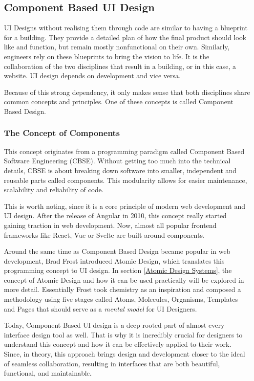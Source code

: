 \newpage
\subsection{Component Based UI Design}
UI Designs without realising them through code are similar to having a blueprint for a building.
They provide a detailed plan of how the final product should look like and function, but remain
mostly nonfunctional on their own. Similarly, engineers rely on these blueprints to bring the vision
to life. It is the collaboration of the two disciplines that result in a building, or in this case,
a website. UI design depends on development and vice versa. 

Because of this strong dependency, it only makes sense that both disciplines share common concepts
and principles. One of these concepts is called Component Based Design.

\subsubsection{The Concept of Components}
This concept originates from a programming paradigm called Component Based Software Engineering
(CBSE). Without getting too much into the technical details, CBSE is about breaking down software
into smaller, independent and reusable parts called components. This modularity allows for easier
maintenance, scalability and reliability of code.

This is worth noting, since it is a core principle of modern web development and UI design.
After the release of Angular in 2010, this concept really started gaining traction in web
development. 
Now, almost all popular frontend frameworks like React, Vue or Svelte are built around components.
  

Around the same time as Component Based Design became popular in web development, Brad Frost
introduced Atomic Design, which translates this programming concept to UI design. In section
\ref{Atomic Design Systems}, the concept of Atomic Design and how it can be used practically will be
explored in more detail. Essentially Frost took chemistry as an inspiration and composed a methodology
using five stages called Atoms, Molecules, Organisms, Templates and Pages that should serve as a
\textit{mental model} for UI Designers. 

Today, Component Based UI design is a deep rooted part of almost every interface design tool as
well. That is why it is incredibly crucial for designers to understand this concept and how it can
be effectively applied to their work. Since, in theory, this approach brings design and development
closer to the ideal of seamless collaboration, resulting in interfaces that are both beautiful,
functional, and maintainable.